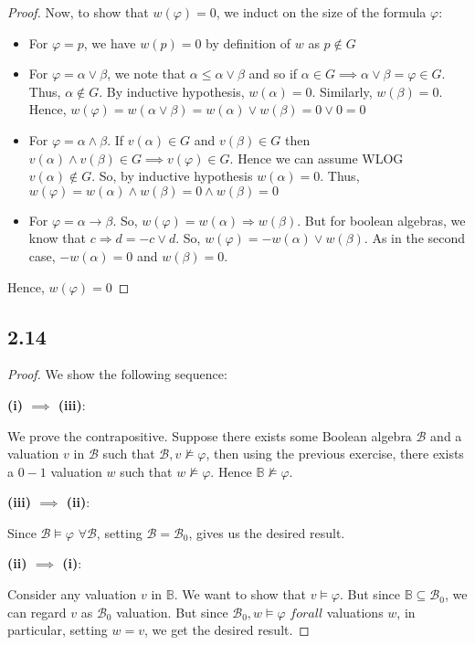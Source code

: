 \documentclass[12pt]{article}
\begin{document}
\begin{proof}
Now, to show that $w(\varphi) = 0$, we induct on the size of the formula $\varphi$:
\begin{itemize}
    \item For $\varphi = p$, we have $w(p) = 0$ by definition of $w$ as $p \not \in G$
    \item For $\varphi = \alpha \vee \beta$, we note that $\alpha \leq \alpha \vee \beta$ and so if $\alpha \in G \implies \alpha \vee \beta = \varphi \in G$. Thus, $\alpha \not \in G$. By inductive hypothesis, $w(\alpha) = 0$. Similarly, $w(\beta) = 0$. Hence, $w(\varphi) = w(\alpha \vee \beta) = w(\alpha) \vee w(\beta) = 0 \vee 0 = 0$
    \item For $\varphi = \alpha \wedge \beta$. If $v(\alpha) \in G$ and $v(\beta) \in G$ then $v(\alpha) \wedge v(\beta) \in G \implies v(\varphi) \in G$. Hence we can assume WLOG $v(\alpha) \not \in G$. So, by inductive hypothesis $w(\alpha) = 0$. Thus, $w(\varphi) = w(\alpha) \wedge w(\beta) = 0 \wedge w(\beta) = 0$
    \item For $\varphi = \alpha \rightarrow \beta$. So, $w(\varphi) = w(\alpha) \Rightarrow w(\beta)$. But for boolean algebras, we know that $c \Rightarrow d = -c \vee d$. So, $w(\varphi) = -w(\alpha) \vee w(\beta)$. As in the second case, $-w(\alpha) = 0$ and $w(\beta) = 0$.
\end{itemize}
Hence, $w(\varphi) = 0$
\end{proof}

\subsection*{2.14}

\begin{proof}
We show the following sequence:

\textbf{(i) $\implies$ (iii)}:

We prove the contrapositive. Suppose there exists some Boolean algebra $\mathcal{B}$ and a valuation $v$ in $\mathcal{B}$ such that $\mathcal{B}, v \not \models \varphi$, then using the previous exercise, there exists a $0-1$ valuation $w$ such that $w \not \models \varphi$. Hence $\mathbb{B} \not \models \varphi$.

\textbf{(iii) $\implies$ (ii)}:

Since $\mathcal{B} \models \varphi$ $\forall \mathcal{B}$, setting $\mathcal{B} = \mathcal{B}_0$, gives us the desired result.

\textbf{(ii) $\implies$ (i)}:

Consider any valuation $v$ in $\mathbb{B}$. We want to show that $v \models \varphi$. But since $\mathbb{B} \subseteq \mathcal{B}_0$, we can regard $v$ as $\mathcal{B}_0$ valuation. But since $\mathcal{B}_0,w \models \varphi$ $forall$ valuations $w$, in particular, setting $w=v$, we get the desired result.

\end{proof}
\end{document}
